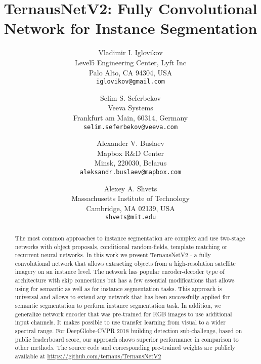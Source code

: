 \documentclass[10pt,twocolumn,letterpaper]{article}
\begin{document}
\title{TernausNetV2: Fully Convolutional Network for Instance Segmentation}

\author{Vladimir I. Iglovikov\\
Level5 Engineering Center, Lyft Inc\\
Palo Alto, CA 94304, USA\\
{\tt\small iglovikov@gmail.com}
\and
Selim S. Seferbekov\\
Veeva Systems\\
Frankfurt am Main, 60314, Germany\\
{\tt\small selim.seferbekov@veeva.com}
\and
Alexander V. Buslaev\\
Mapbox R$\&$D Center\\
Minsk, 220030, Belarus\\
{\tt\small aleksandr.buslaev@mapbox.com}
\and
Alexey A. Shvets\\
Massachusetts Institute of Technology\\
Cambridge, MA 02139, USA\\
{\tt\small shvets@mit.edu}
}

\maketitle

\begin{abstract}
The most common approaches to instance segmentation are complex and use two-stage networks with object proposals, conditional random-fields, template matching or recurrent neural networks. In this work we present TernausNetV2 - a fully convolutional network that allows extracting objects from a high-resolution satellite imagery on an instance level. The network has popular encoder-decoder type of architecture with skip connections but has a few essential modifications that allows using for semantic as well as for instance segmentation tasks. This approach is universal and allows to extend any network that has been successfully applied for semantic segmentation to perform instance segmentation task. In addition, we generalize network encoder that was pre-trained for RGB images to use additional input channels. It makes possible to use transfer learning from visual to a wider spectral range. For DeepGlobe-CVPR 2018 building detection sub-challenge, based on public leaderboard score, our approach shows superior performance in comparison to other methods. The source code and corresponding pre-trained weights are publicly available at \url{https://github.com/ternaus/TernausNetV2} 
\end{abstract}
\end{document}
